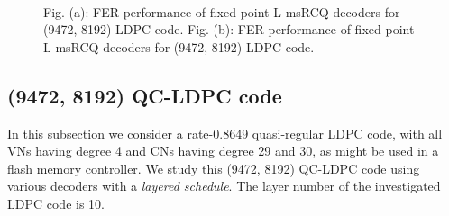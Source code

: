 \documentclass [PhD] {uclathes}
\begin{document}
\begin{figure}[hp] 
    \centering
\\
  \caption{Fig. (a): FER performance of fixed point L-msRCQ decoders for (9472, 8192) LDPC code.  Fig.  (b): FER performance of fixed point L-msRCQ decoders for (9472, 8192) LDPC code. } \label{fig: 8k_performance}
\end{figure}

\subsection{(9472, 8192) QC-LDPC code}
In this subsection we consider a rate-0.8649 quasi-regular LDPC code, with all VNs having degree 4 and CNs having degree 29 and 30, as might be used in a flash memory controller. We study this (9472, 8192) QC-LDPC code using various decoders with a \textit{layered schedule}. The layer number of the investigated LDPC code is 10.  
\end{document}
